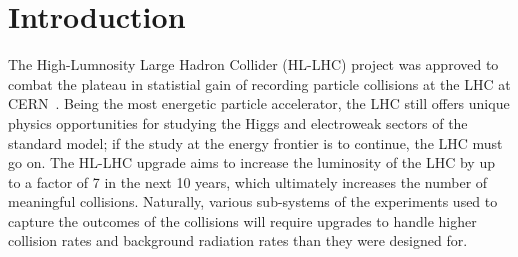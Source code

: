 
\chapter{Introduction}
\label{chap:intro}


The High-Lumnosity Large Hadron Collider (HL-LHC) project was approved to combat the plateau in statistial gain of recording particle collisions at the LHC at CERN~\cite{hl_lhc_tdr}. Being the most energetic particle accelerator, the LHC still offers unique physics opportunities for studying the Higgs and electroweak sectors of the standard model\cite{dainese_physics_2018}; if the study at the energy frontier is to continue, the LHC must go on. The HL-LHC upgrade aims to increase the luminosity of the LHC by up to a factor of 7 in the next 10 years, which ultimately increases the number of meaningful collisions. Naturally, various sub-systems of the experiments used to capture the outcomes of the collisions will require upgrades to handle higher collision rates and background radiation rates than they were designed for. 

